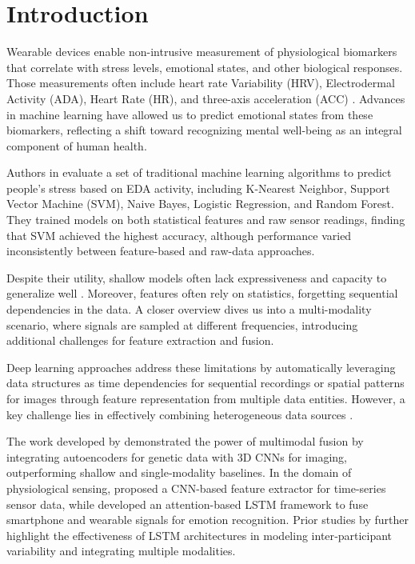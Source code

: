 \section{Introduction}
Wearable devices enable non-intrusive measurement of physiological biomarkers that correlate with stress levels, emotional states, and other biological responses. Those measurements often include heart rate Variability (HRV), Electrodermal Activity (ADA), Heart Rate (HR), and three-axis acceleration (ACC) \cite{Vos2023}. Advances in machine learning have allowed us to predict emotional states from these biomarkers, reflecting a shift toward recognizing mental well-being as an integral component of human health.

Authors in \cite{Zhu2023} evaluate a set of traditional machine learning algorithms to predict people's stress based on EDA activity, including K-Nearest Neighbor, Support Vector Machine (SVM), Naive Bayes, Logistic Regression, and Random Forest. They trained models on both statistical features and raw sensor readings, finding that SVM achieved the highest accuracy, although performance varied inconsistently between feature-based and raw-data approaches.

Despite their utility, shallow models often lack expressiveness and capacity to generalize well \cite{Yang2023}. Moreover, features often rely on statistics, forgetting sequential dependencies in the data. A closer overview dives us into a multi-modality scenario, where signals are sampled at different frequencies, introducing additional challenges for feature extraction and fusion.

Deep learning approaches address these limitations by automatically leveraging data structures as time dependencies for sequential recordings or spatial patterns for images through feature representation from multiple data entities. However, a key challenge lies in effectively combining heterogeneous data sources \cite{Baltrusaitis2019,Liang2024}. 

The work developed by \cite{Venugopalan2021} demonstrated the power of multimodal fusion by integrating autoencoders for genetic data with 3D CNNs for imaging, outperforming shallow and single‑modality baselines. In the domain of physiological sensing, \cite{Wan2020743} proposed a CNN-based feature extractor for time-series sensor data, while \cite{Yang20231082} developed an attention-based LSTM framework to fuse smartphone and wearable signals for emotion recognition. Prior studies by \cite{Zhang20211138,Li20213323} further highlight the effectiveness of LSTM architectures in modeling inter‑participant variability and integrating multiple modalities.
